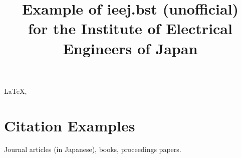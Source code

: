 \documentclass[english]{ieej-e}
\title{Example of ieej.bst (unofficial)\\for the Institute of Electrical Engineers of Japan}
\begin{document}
\begin{abstract}

\end{abstract}
\begin{keyword}
  \LaTeX, 
\end{keyword}
\maketitle


\section{Citation Examples}
Journal articles (in Japanese)\cite{Denki2001}, books\cite{Knuth1994}, proceedings papers\cite{Yamada2001}.




\end{document}
